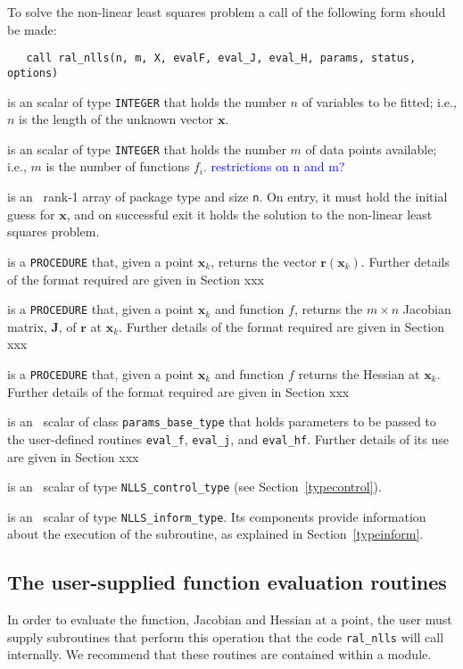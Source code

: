 \documentclass{hslspec}
\newcommand{\scalarintegerii}{is an \intentin scalar of type {\tt INTEGER} }
\begin{document}
To solve the non-linear least squares problem a call of the following form should be made:

\begin{verbatim}
   call ral_nlls(n, m, X, evalF, eval_J, eval_H, params, status, options)
\end{verbatim}

\begin{description}
 \scalarintegerii that holds the number $n$ of 
variables to be fitted; i.e., $n$ is the length of the unknown vector $\bm x$.

 \scalarintegerii that holds the number $m$ of 
data points available; i.e., $m$ is the number of functions $f_i$.
\textcolor{blue}{restrictions on n and m?}

 is an \intentinout\  rank-1 array of package type 
and size {\tt n}.  On entry, it must hold the initial guess for $\bm x$, and on 
successful exit it holds the solution to the non-linear least squares problem.

 is a {\tt PROCEDURE} that, given a point ${\bm x}_k$, returns the vector ${\bm r}({\bm x}_k)$.  
Further details of the format required are given in Section {\color{red}xxx}

 is a {\tt PROCEDURE} that, given a point ${\bm x}_k$
and function $f$, returns the $m \times n$ Jacobian matrix, $\bm J$, of ${\bm r}$ at ${\bm x}_k$.  
Further details of the format required are given in Section {\color{red}xxx}

 is a {\tt PROCEDURE} that, given a point ${\bm x}_k$
and function $f$ returns the Hessian at ${\bm x}_k$. 
Further details of the format required are given in Section {\color{red}xxx}

 is an \intentin\ scalar of class {\tt params\_base\_type} that holds parameters to 
be passed to the user-defined routines {\tt eval\_f}, {\tt eval\_j}, and {\tt eval\_hf}. 
Further details of its use are given in Section {\color{red}xxx}

is an \intentin\  scalar  of type {\tt NLLS\_control\_type}
(see Section~\ref{typecontrol}).

 is an \intentinout\ scalar of type 
{\tt NLLS\_inform\_type}. Its components provide information about the execution
of the subroutine, as explained in Section~\ref{typeinform}.

\end{description}


\subsection{The user-supplied function evaluation routines}
\label{sec::function_eval}
In order to evaluate the function, Jacobian and Hessian at a point, the user must supply
subroutines that perform this operation that the code {\tt ral\_nlls} will call internally.  
We recommend that these routines are contained within a module.
\end{document}
